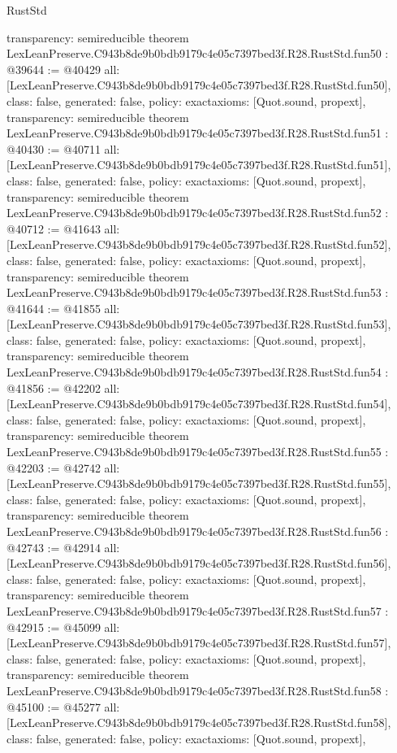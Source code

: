 \begin{lexlean}{RustStd}
\begin{coremodule}
{  transparency: semireducible
}
theorem LexLeanPreserve.C943b8de9b0bdb9179c4e05c7397bed3f.R28.RustStd.fun50 : @39644 := @40429 {
  all: [LexLeanPreserve.C943b8de9b0bdb9179c4e05c7397bed3f.R28.RustStd.fun50],
  class: false,
  generated: false,
  policy: exact{axioms: [Quot.sound, propext]},
  transparency: semireducible
}
theorem LexLeanPreserve.C943b8de9b0bdb9179c4e05c7397bed3f.R28.RustStd.fun51 : @40430 := @40711 {
  all: [LexLeanPreserve.C943b8de9b0bdb9179c4e05c7397bed3f.R28.RustStd.fun51],
  class: false,
  generated: false,
  policy: exact{axioms: [Quot.sound, propext]},
  transparency: semireducible
}
theorem LexLeanPreserve.C943b8de9b0bdb9179c4e05c7397bed3f.R28.RustStd.fun52 : @40712 := @41643 {
  all: [LexLeanPreserve.C943b8de9b0bdb9179c4e05c7397bed3f.R28.RustStd.fun52],
  class: false,
  generated: false,
  policy: exact{axioms: [Quot.sound, propext]},
  transparency: semireducible
}
theorem LexLeanPreserve.C943b8de9b0bdb9179c4e05c7397bed3f.R28.RustStd.fun53 : @41644 := @41855 {
  all: [LexLeanPreserve.C943b8de9b0bdb9179c4e05c7397bed3f.R28.RustStd.fun53],
  class: false,
  generated: false,
  policy: exact{axioms: [Quot.sound, propext]},
  transparency: semireducible
}
theorem LexLeanPreserve.C943b8de9b0bdb9179c4e05c7397bed3f.R28.RustStd.fun54 : @41856 := @42202 {
  all: [LexLeanPreserve.C943b8de9b0bdb9179c4e05c7397bed3f.R28.RustStd.fun54],
  class: false,
  generated: false,
  policy: exact{axioms: [Quot.sound, propext]},
  transparency: semireducible
}
theorem LexLeanPreserve.C943b8de9b0bdb9179c4e05c7397bed3f.R28.RustStd.fun55 : @42203 := @42742 {
  all: [LexLeanPreserve.C943b8de9b0bdb9179c4e05c7397bed3f.R28.RustStd.fun55],
  class: false,
  generated: false,
  policy: exact{axioms: [Quot.sound, propext]},
  transparency: semireducible
}
theorem LexLeanPreserve.C943b8de9b0bdb9179c4e05c7397bed3f.R28.RustStd.fun56 : @42743 := @42914 {
  all: [LexLeanPreserve.C943b8de9b0bdb9179c4e05c7397bed3f.R28.RustStd.fun56],
  class: false,
  generated: false,
  policy: exact{axioms: [Quot.sound, propext]},
  transparency: semireducible
}
theorem LexLeanPreserve.C943b8de9b0bdb9179c4e05c7397bed3f.R28.RustStd.fun57 : @42915 := @45099 {
  all: [LexLeanPreserve.C943b8de9b0bdb9179c4e05c7397bed3f.R28.RustStd.fun57],
  class: false,
  generated: false,
  policy: exact{axioms: [Quot.sound, propext]},
  transparency: semireducible
}
theorem LexLeanPreserve.C943b8de9b0bdb9179c4e05c7397bed3f.R28.RustStd.fun58 : @45100 := @45277 {
  all: [LexLeanPreserve.C943b8de9b0bdb9179c4e05c7397bed3f.R28.RustStd.fun58],
  class: false,
  generated: false,
  policy: exact{axioms: [Quot.sound, propext]},
}
\end{coremodule}
\end{lexlean}
